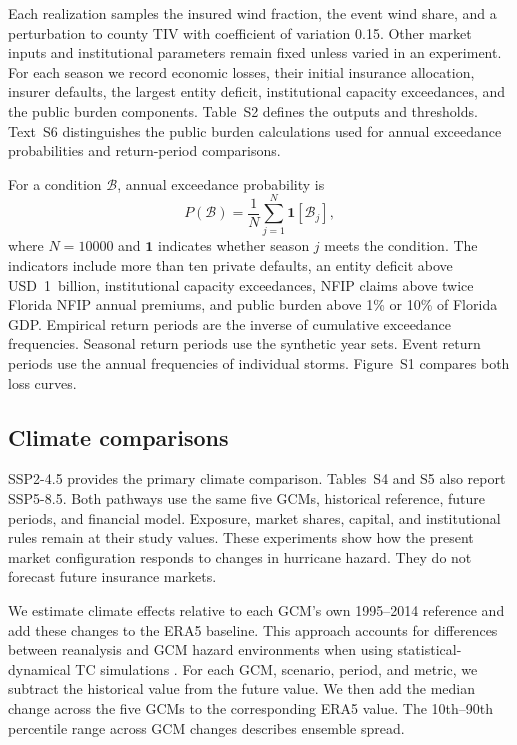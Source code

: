 Each realization samples the insured wind fraction, the event wind share, and a perturbation to county TIV with coefficient of variation 0.15. Other market inputs and institutional parameters remain fixed unless varied in an experiment. For each season we record economic losses, their initial insurance allocation, insurer defaults, the largest entity deficit, institutional capacity exceedances, and the public burden components. Table~S2 defines the outputs and thresholds. Text~S6 distinguishes the public burden calculations used for annual exceedance probabilities and return-period comparisons.

For a condition $\mathcal{B}$, annual exceedance probability is
\begin{equation}
P(\mathcal{B}) = \frac{1}{N}\sum_{j=1}^{N}\mathbf{1}\!\left[\mathcal{B}_j\right],
\end{equation}
where $N=\num{10000}$ and $\mathbf{1}$ indicates whether season $j$ meets the condition. The indicators include more than ten private defaults, an entity deficit above USD~1~billion, institutional capacity exceedances, NFIP claims above twice Florida NFIP annual premiums, and public burden above 1\% or 10\% of Florida GDP. Empirical return periods are the inverse of cumulative exceedance frequencies. Seasonal return periods use the synthetic year sets. Event return periods use the annual frequencies of individual storms. Figure~S1 compares both loss curves.

\subsection*{Climate comparisons}\label{MethodsFutureClim}
SSP2-4.5 provides the primary climate comparison. Tables~S4 and S5 also report SSP5-8.5. Both pathways use the same five GCMs, historical reference, future periods, and financial model. Exposure, market shares, capital, and institutional rules remain at their study values. These experiments show how the present market configuration responds to changes in hurricane hazard. They do not forecast future insurance markets.

We estimate climate effects relative to each GCM's own 1995--2014 reference and add these changes to the ERA5 baseline. This approach accounts for differences between reanalysis and GCM hazard environments when using statistical-dynamical TC simulations \cite{emanuel_hurricanes_2008,camargo_global_2013}. For each GCM, scenario, period, and metric, we subtract the historical value from the future value. We then add the median change across the five GCMs to the corresponding ERA5 value. The 10th--90th percentile range across GCM changes describes ensemble spread.

